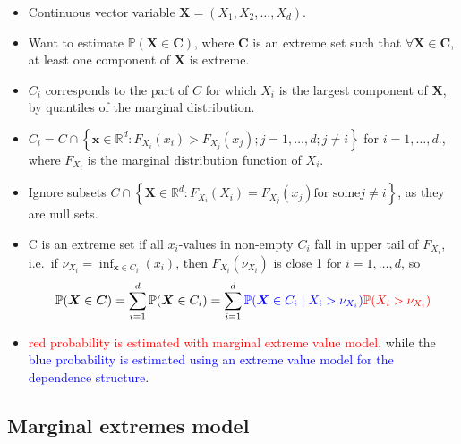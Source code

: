 \documentclass{article}
\numberwithin{equation}{section}
\begin{document}
\begin{itemize} 
  \item Continuous vector variable $\bm{X} = (X_1, X_2, \ldots, X_d)$. 
  \item Want to estimate $\mathbb{P}(\bm{X} \in \bm{C})$, where $\bm{C}$ is an extreme set such that $\forall \bm{X} \in \bm{C}$, at least one component of $\bm{X}$ is extreme. 
  \item $C_i$ corresponds to the part of $C$ for which $X_i$ is the largest component of $\bm{X}$, by quantiles of the marginal distribution. 
  \item $C_i = C \cap \left\{ \bm{x} \in \mathbb{R}^d: F_{X_i}(x_i) > F_{X_j}(x_j); j = 1, \ldots, d; j \ne i \right\}$ for $i = 1, \ldots, d$., where $F_{X_i}$ is the marginal distribution function of $X_i$. %
  \item Ignore subsets $C \cap \left\{ \bm{X} \in \mathbb{R}^d: F_{X_i}(X_i) = F_{X_j}(x_j) \text{for some} j \ne i \right\}$, as they are null sets. 
  \item C is an extreme set if all $x_i$-values in non-empty $C_i$ fall in upper tail of $F_{X_i}$, i.e.\ if $\nu_{X_i} = \inf_{\bm{x} \in C_i}{(x_i)}$, then $F_{X_i}(\nu_{X_i})$ is close 1 for $i = 1, \ldots, d$, so 
  \[
  \mathbb{P}(\bm{X} \in \bm{C}) = \sum_{i=1}^{d}{\mathbb{P}(\bm{X} \in C_i)} = \sum_{i=1}^{d}\textcolor{blue}{\mathbb{P}(\bm{X} \in C_i\mid X_i > \nu_{X_i})}\textcolor{red}{\mathbb{P}(X_i> \nu_{X_i})}
  \]
  \item \textcolor{red}{red probability is estimated with marginal extreme value model}, while the \textcolor{blue}{blue probability is estimated using an extreme value model for the dependence structure}. 
\end{itemize}

\subsection{Marginal extremes model}
\end{document}
